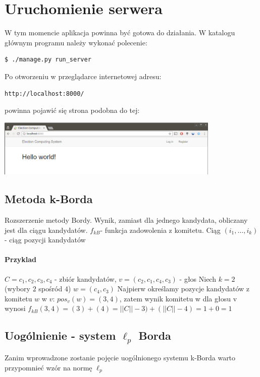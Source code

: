 \documentclass{../aghdoc}               %
\begin{document}
\section{Uruchomienie serwera}
\label{sec:serwer}

W tym momencie aplikacja powinna być gotowa do działania.
W katalogu głównym programu należy wykonać polecenie:
\begin{lstlisting}[language=bash]
$ ./manage.py run_server
\end{lstlisting}

Po otworzeniu w przeglądarce internetowej adresu:
\begin{lstlisting}
http://localhost:8000/
\end{lstlisting}
powinna pojawić się strona podobna do tej:


\includegraphics[width=0.8\textwidth]{pics/first_view.png}


\subsection{Metoda k-Borda}
\label{subsec:metoda_k_borda}

Rozszerzenie metody Bordy. Wynik, zamiast dla jednego kandydata, obliczany jest dla ciągu kandydatów. $f_{kB}$- funkcja zadowolenia z komitetu. Ciąg $(i_1,\dots, i_k)$- ciąg pozycji kandydatów

\paragraph{Przyklad}
$C={c_1,c_2,c_3,c_4}$ - zbiór kandydatów, 
$v=(c_2,c_1,c_4,c_3)$ - głos
Niech $k = 2$ (wybory $2$ spośród $4$)
$w=(c_4,c_3)$
Najpierw określamy pozycje kandydatów z komitetu $w$ w $v$:
$pos_v(w)=(3,4)$, zatem wynik komitetu w dla głosu v wynosi
$f_{kB}(3,4) = (3) + (4) = ||C|| - 3 ) + ( ||C|| - 4 ) = 1 + 0 = 1$


\subsection{Uogólnienie - system $\ell_p$ Borda}
\label{subsec:system_ell_p_borda}

Zanim wprowadzone zostanie pojęcie uogólnionego systemu k-Borda warto przypomnieć wzór na normę $\ell_p$
\end{document}
